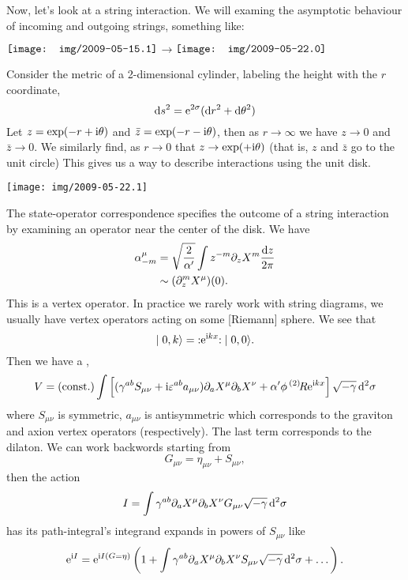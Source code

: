Now, let's look at a string interaction. We will examing the asymptotic
behaviour of incoming and outgoing strings, something like:
\begin{center}
  $\vcenter{\hbox{\texttt{[image: img/2009-05-15.1]}}}$\quad$\longrightarrow$\quad$\vcenter{\hbox{\texttt{[image: img/2009-05-22.0]}}}$
\end{center}
Consider the metric of a 2-dimensional cylinder, labeling the height
with the $r$ coordinate,
\begin{equation}
\mathrm{d} s^{2} = \mathrm{e}^{2\sigma}(\mathrm{d} r^{2} + \mathrm{d}\theta^{2})
\end{equation}
Let $z=\exp(-r+\mathrm{i}\theta)$ and $\bar{z}=\exp(-r-\mathrm{i}\theta)$, then as
$r\to\infty$ we have $z\to0$ and $\bar{z}\to0$. We similarly find, as
$r\to0$ that $z\to\exp(+\mathrm{i}\theta)$ (that is, $z$ and $\bar{z}$ go to the unit circle)
This gives us a way to describe interactions using the unit disk.
\begin{center}\texttt{[image: img/2009-05-22.1]}
\end{center}
The state-operator correspondence specifies the outcome of a string
interaction by examining an operator near the center of the disk. We
have
\begin{equation}
\begin{split}
\alpha^{\mu}_{-m} &= \sqrt{\frac{2}{\alpha'}}\int
z^{-m}\partial_{z}X^{m}\frac{\mathrm{d} z}{2\pi}\\
&\sim (\partial_{z}^{m}X^{\mu})(0).
\end{split}
\end{equation}
This is a vertex operator. In practice we rarely work with string
diagrams, we usually have vertex operators acting on some [Riemann] sphere.
We see that
\begin{equation}
\mid0,k\rangle = \mathopen{:}\mathrm{e}^{\mathrm{i} kx}\mathclose{:}\mid0,0\rangle.
\end{equation}
Then we have a ,
\begin{equation}
V = (\mbox{const.})\int\left[
(\gamma^{ab}S_{\mu\nu}+\mathrm{i}\varepsilon^{ab}a_{\mu\nu})\partial_{a}X^{\mu}\partial_{b}X^{\nu}
+\alpha'\phi\,{}^{(2)}\!R\mathrm{e}^{\mathrm{i} kx}
  \right]\sqrt{-\gamma}\,\mathrm{d}^{2}\sigma
\end{equation}
where $S_{\mu\nu}$ is symmetric, $a_{\mu\nu}$ is antisymmetric which
corresponds to the graviton and axion vertex operators (respectively).
The last term corresponds to the dilaton. We can work backwords starting
from
\begin{equation}
G_{\mu\nu} = \eta_{\mu\nu}+S_{\mu\nu},
\end{equation}
then the action
\begin{equation}
I = \int \gamma^{ab}\partial_{a}X^{\mu}\partial_{b}X^{\nu}G_{\mu\nu}\sqrt{-\gamma}\,\mathrm{d}^{2}\sigma
\end{equation}
has its path-integral's integrand expands in powers of $S_{\mu\nu}$ like
\begin{equation}
\mathrm{e}^{\mathrm{i}I}=\mathrm{e}^{\mathrm{i}I(G=\eta)}\left(1 + \int\gamma^{ab}\partial_{a}X^{\mu}\partial_{b}X^{\nu}S_{\mu\nu}\sqrt{-\gamma}\,\mathrm{d}^{2}\sigma+\dots\right).
\end{equation}
